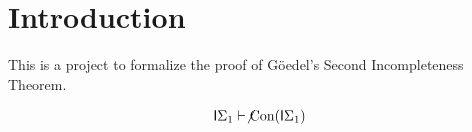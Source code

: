 \chapter{Introduction}

This is a project to formalize the proof of G\"oedel's Second Incompleteness Theorem.

\begin{align*}
  \mathsf{I}\Sigma_1 \vdash \not\mathrm{Con}(\mathsf{I}\Sigma_1)
\end{align*}
